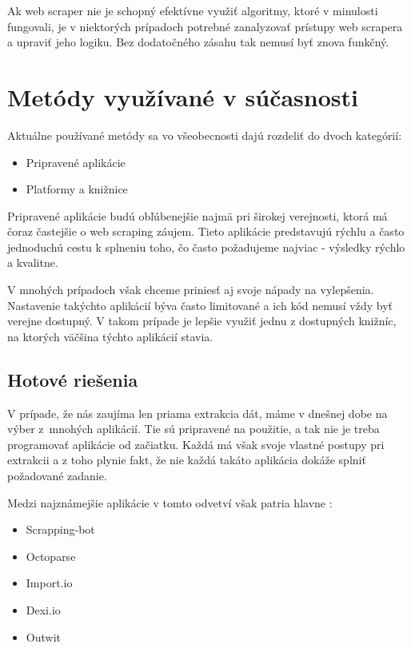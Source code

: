 Ak web scraper nie je schopný efektívne využiť algoritmy, ktoré v minulosti fungovali, je v niektorých prípadoch potrebné zanalyzovať prístupy web scrapera a upraviť jeho logiku. Bez dodatočného zásahu tak nemusí byť znova funkčný.

\section{Metódy využívané v súčasnosti}

Aktuálne používané metódy sa vo všeobecnosti dajú rozdeliť do dvoch kategórií:
\begin{itemize}
    \item {Pripravené aplikácie}
    \item {Platformy a knižnice}
\end{itemize}

\bigskip

Pripravené aplikácie budú obľúbenejšie najmä pri širokej verejnosti, ktorá má čoraz častejšie o web scraping záujem. Tieto aplikácie predstavujú rýchlu a často jednoduchú cestu k splneniu toho, čo často požadujeme najviac - výsledky rýchlo a kvalitne.

V mnohých prípadoch však chceme priniesť aj svoje nápady na vylepšenia. Nastavenie takýchto aplikácií býva často limitované a ich kód nemusí vždy byť verejne dostupný. V takom prípade je lepšie využiť jednu z dostupných knižníc, na ktorých väčšina týchto aplikácií stavia. 

\subsection{Hotové riešenia}
V prípade, že nás zaujíma len priama extrakcia dát, máme v dnešnej dobe na výber z~mnohých aplikácií. Tie sú pripravené na použitie, a tak nie je treba programovať aplikácie od začiatku. Každá má však svoje vlastné postupy pri extrakcii a z toho plynie fakt, že nie každá takáto aplikácia dokáže splniť požadované zadanie. 

\newpage
Medzi najznámejšie aplikácie v tomto odvetví však patria hlavne \cite{WebScrap}:

\begin{itemize}
    \item {Scrapping-bot}
    \item {Octoparse}
    \item {Import.io}
    \item {Dexi.io}
    \item {Outwit}
\end{itemize}

